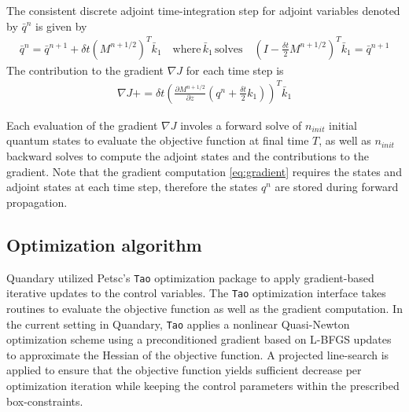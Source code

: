 \documentclass[11pt]{article}
\begin{document}
  The consistent discrete adjoint time-integration step for
    adjoint variables denoted by $\bar q^{n}$ is given by
   \begin{align}
      \bar q^{n} = \bar q^{n+1} + \delta t \left(M^{n+1/2}\right)^T \bar k_1
      \quad \text{where} \, \bar k_1 \, \text{solves} \quad \left(
      I-\frac{\delta t}{2} M^{n+1/2}\right)^T  \bar k_1 = \bar q^{n+1} 
    \end{align}
  The contribution to the gradient $\nabla J$ for each time step is
    \begin{align}\label{eq:gradient}
      \nabla J += \delta t \left( \frac{\partial M^{n+1/2}}{\partial z}
      \left(q^n + \frac{\delta t}{2} k_1\right) \right)^T\bar k_1
    \end{align}
  
    Each evaluation of the gradient $\nabla J$ involes a forward solve of $n_{init}$ initial quantum states to evaluate the objective function at final time $T$, as well as $n_{init}$ backward solves to compute the adjoint states and the contributions to the gradient. Note that the gradient computation \eqref{eq:gradient} requires the states and adjoint states at each time step, therefore the states $q^n$ are stored during forward propagation. 


  \subsection{Optimization algorithm}
    Quandary utilized Petsc's \texttt{Tao} optimization package to apply gradient-based iterative updates to the control variables. The \texttt{Tao} optimization interface takes routines to evaluate the objective function as well as the gradient computation. In the current setting in Quandary, \texttt{Tao} applies a nonlinear Quasi-Newton optimization scheme using a preconditioned gradient based on L-BFGS updates to approximate the Hessian of the objective function. A projected line-search is applied to ensure that the objective function yields sufficient decrease per optimization iteration while keeping the control parameters within the prescribed box-constraints. 
\end{document}
